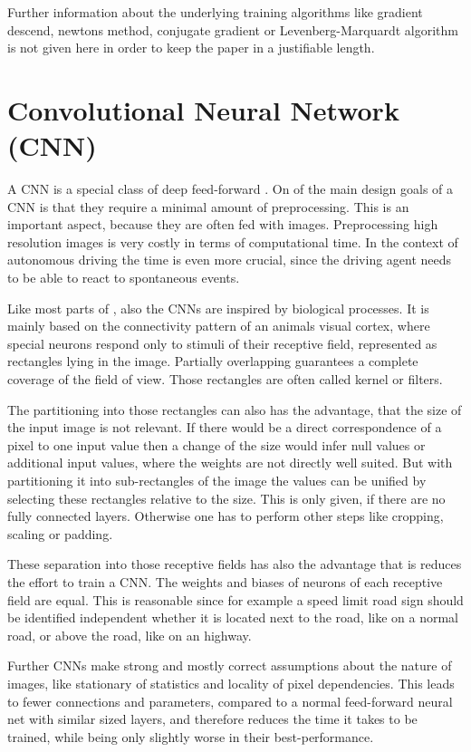 Further information about the underlying training algorithms like gradient descend, newtons method, conjugate gradient or Levenberg-Marquardt algorithm is not given here in order to keep the paper in a justifiable length.  


\section{Convolutional Neural Network (CNN)}\label{sec:CNN}

A CNN is a special class of deep feed-forward \nns. On of the main design goals of a CNN is that they require a minimal amount of preprocessing. This is an important aspect, because they are often fed with images. Preprocessing high resolution images is very costly in terms of computational time. In the context of autonomous driving the time is even more crucial, since the driving agent needs to be able to react to spontaneous events.

Like most parts of \nns, also the CNNs are inspired by biological processes. It is mainly based on the connectivity pattern of an animals visual cortex, where special neurons respond only to stimuli of their receptive field, represented as rectangles lying in the image. Partially overlapping guarantees a complete coverage of the field of view. Those rectangles are often called kernel or filters.\cite{matsugu2003subject}

The partitioning into those rectangles can also has the advantage, that the size of the input image is not relevant. If there would be a direct correspondence of a pixel to one input value then a change of the size would infer null values or additional input values, where the weights are not directly well suited. But with partitioning it into sub-rectangles of the image the values can be unified by selecting these rectangles relative to the size.
This is only given, if there are no fully connected layers. Otherwise one has to perform other steps like cropping, scaling or padding. %

These separation into those receptive fields has also the advantage that is reduces the effort to train a CNN. The weights and biases of neurons of each receptive field are equal. This is reasonable since for example a speed limit road sign should be identified independent whether it is located next to the road, like on a normal road, or above the road, like on an highway. \cite{lecun2015lenet}

Further CNNs make strong and mostly correct assumptions about the nature of images, like stationary of statistics and locality of pixel dependencies. This leads to fewer connections and parameters, compared to a normal feed-forward neural net with similar sized layers, and therefore reduces the time it takes to be trained, while being only slightly worse in their best-performance. \cite{krizhevsky2012imagenet}

